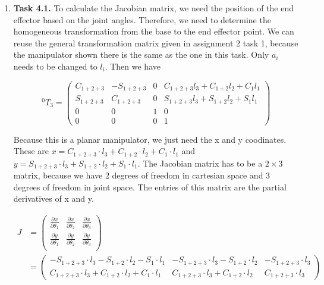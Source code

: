 \documentclass[a4paper,11pt]{article}
\author{\authorinfo}
\title{\titleinfo}
\date{\today}
\begin{document}
\maketitle
\begin {enumerate}
	\item[\textbf{Task 4.1.}]
		To calculate the Jacobian matrix, we need the position of the end effector based on the joint angles. Therefore, we need to determine the homogeneous transformation from the base to the end effector point. We can reuse the general transformation matrix given in assignment 2 task 1, because the manipulator shown there is the same as the one in this task. Only $a_i$ needs to be changed to $l_i$. Then we have

		$${^{0}T_3} = \begin{pmatrix}
			C_{1+2+3} & -S_{1+2+3} & 0 & C_{1+2+3}l_3 + C_{1+2}l_2+C_1l_1\\
			S_{1+2+3} & C_{1+2+3} & 0 & S_{1+2+3}l_3 + S_{1+2}l_2 + S_1l_1\\
			0 & 0 & 1 & 0\\
			0 & 0 & 0 & 1
		\end{pmatrix}$$

		Because this is a planar manipulator, we just need the x and y coodinates. These are $x = C_{1+2+3} \cdot l_3 + C_{1+2} \cdot l_2 + C_1 \cdot l_1$ and $y = S_{1+2+3} \cdot l_3 + S_{1+2} \cdot l_2 + S_1 \cdot l_1$. The Jacobian matrix has to be a $2 \times 3$ matrix, because we have 2 degrees of freedom in cartesian space and 3 degrees of freedom in joint space. The entries of this matrix are the partial derivatives of x and y.

		\begin{align*}
			J &= \begin{pmatrix}
				\frac{\partial x}{\partial \theta_1} & \frac{\partial x}{\partial \theta_2} & \frac{\partial x}{\partial \theta_3} \\[6pt]
				\frac{\partial y}{\partial \theta_1} & \frac{\partial y}{\partial \theta_2} & \frac{\partial y}{\partial \theta_3} \\
			\end{pmatrix}\\
			&= \begin{pmatrix}
				-S_{1+2+3} \cdot l_3 - S_{1+2} \cdot l_2 - S_1 \cdot l_1 & -S_{1+2+3} \cdot l_3 - S_{1+2} \cdot l_2 & -S_{1+2+3} \cdot l_3\\
				C_{1+2+3} \cdot l_3 + C_{1+2} \cdot l_2 + C_1 \cdot l_1 & C_{1+2+3} \cdot l_3 + C_{1+2} \cdot l_2 & C_{1+2+3} \cdot l_3
			\end{pmatrix}\\
		\end{align*}



\end{enumerate}
\end{document}
